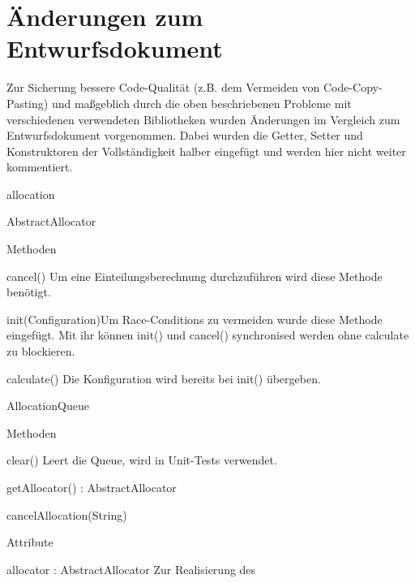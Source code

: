 \documentclass[parskip=full]{scrartcl}
\newcommand{\changeDescription}[1]{{\newline\color{black}\normalfont #1}}
\newcommand{\code}[1]{{\ttfamily #1}}
\begin{document}
\section{Änderungen zum Entwurfsdokument}
Zur Sicherung bessere Code-Qualität (z.B. dem Vermeiden von Code-Copy-Pasting)
und maßgeblich durch die oben beschriebenen Probleme mit verschiedenen
verwendeten Bibliotheken  wurden Änderungen im Vergleich zum  Entwurfsdokument
vorgenommen. 
Dabei wurden die Getter, Setter und Konstruktoren der Vollständigkeit halber
eingefügt und werden hier nicht weiter kommentiert.
\begin{itemPackage}
\item allocation
\begin{itemClass}
\item AbstractAllocator
\begin{itemClassSub}
\item Methoden
\begin{itemPlus}
\item cancel() \changeDescription{Um eine Einteilungsberechnung durchzuführen
wird diese Methode benötigt.}
\item init(Configuration)\changeDescription{Um Race-Conditions zu vermeiden
wurde diese Methode eingefügt. Mit ihr können \code{init()} und \code{cancel()}
synchronised werden ohne calculate zu blockieren.}
\end{itemPlus}
\begin{itemChange}
\item calculate() \changeDescription{Die Konfiguration wird bereits bei
\code{init()} übergeben.}
\end{itemChange}
\end{itemClassSub}
\item AllocationQueue
\begin{itemClassSub}
\item Methoden
\begin{itemPlus}
\item clear() \changeDescription{Leert die Queue, wird in Unit-Tests verwendet.}
\item getAllocator() : AbstractAllocator
\end{itemPlus}
\begin{itemChange}
\item cancelAllocation(String)
\end{itemChange}
\item Attribute
\begin{itemPlus}
\item allocator : AbstractAllocator \changeDescription{Zur Realisierung des
}
\end{itemPlus}
\end{itemClassSub}
\end{itemClass}
\end{itemPackage}
\end{document}

